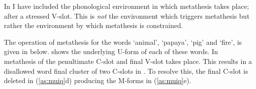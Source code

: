 In  I have included the phonological environment
in which metathesis takes place; after a stressed V-slot.
This is \emph{not} the environment which triggers metathesis
but rather the environment by which metathesis is constrained.

\begin{exe}
	\label{ex:CV->VC/'V-}
\end{exe}

The operation of metathesis for the words  `animal',
 `papaya',  `pig' and  `fire',
is given in  below.
 shows the underlying U-form of each of these words.
In  metathesis of the penultimate C-slot and final V-slot takes place.
This results in a disallowed word final cluster of two C-slots in .
To resolve this, the final C-slot is deleted in (\ref{as:muiq}d)
producing the M-forms in (\ref{as:muiq}e).

